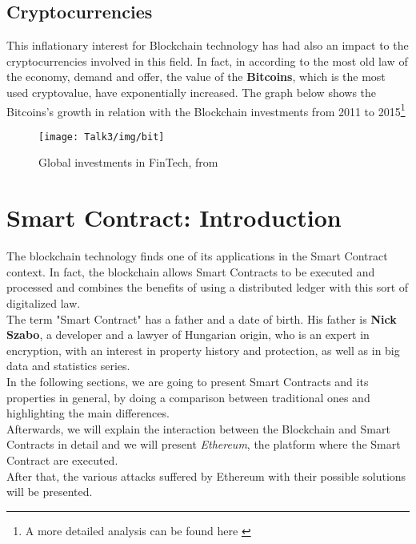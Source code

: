 \subsection{Cryptocurrencies}
This inflationary interest for Blockchain technology has had also an impact to the cryptocurrencies involved in this field. In fact, in according to the most old law of the economy, demand and offer, the value of the \textbf{Bitcoins}, which is the most used cryptovalue, have exponentially increased.
The graph below shows the Bitcoins's growth in relation with the Blockchain investments from 2011 to 2015\footnote{A more detailed analysis can be found here \cite{aaa}} \\

           \begin{figure}[H]
         \begin{center}
         \texttt{[image: Talk3/img/bit]}
         \end{center}
         \caption{Global investments in FinTech, from \cite{aaa}}
         \label{label}
       \end{figure}





\section{Smart Contract: Introduction}
The blockchain technology finds one of its applications in the Smart Contract context. In fact, the blockchain allows Smart Contracts to be executed and processed and combines the benefits of using a distributed ledger with this sort of digitalized law. \\
The term "Smart Contract" has a father and a date of birth. His father is \textbf{Nick Szabo}, a developer and a lawyer of Hungarian origin, who is an expert in encryption, with an interest in property history and protection, as well as in big data and statistics series. \\
In the following sections, we are going to present Smart Contracts and its properties in general, by doing a comparison between traditional ones and highlighting the main differences. \\ Afterwards, we will explain the interaction between the Blockchain and Smart Contracts in detail and we will present \textit{Ethereum}, the platform where the Smart Contract are executed. \\
After that, the various attacks suffered by Ethereum with their possible solutions will be presented.


